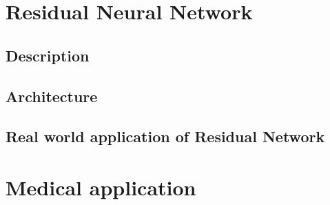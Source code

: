 \section{Residual Neural Network}
    \subsection{Description}
    \subsection{Architecture}
    \subsection{Real world application of Residual Network}

\section{Medical application}
